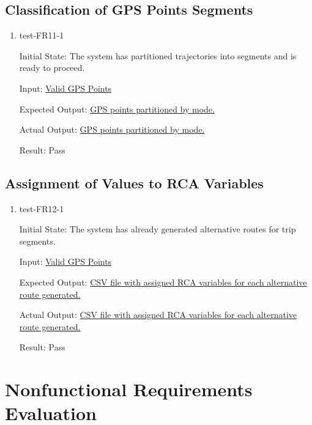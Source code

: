 \documentclass[12pt, titlepage]{article}
\begin{document}
\subsection{Classification of GPS Points Segments}
\begin{enumerate}
    \item test-FR11-1\label{test-FR11-1}
    
    Initial State: The system has partitioned trajectories into segments and is ready to proceed.
    
    Input: \href{https://github.com/paezha/PyERT-BLACK/blob/rev0-test/quarto-example/data/sample-gps/sample-gps-1.csv}{Valid GPS Points}
    
    Expected Output: \href{https://github.com/paezha/PyERT-BLACK/blob/rev0-test/test/test_data/fr-tests/fr11-1-expected.csv}{GPS points partitioned by mode.}
    
    Actual Output: \href{https://github.com/paezha/PyERT-BLACK/blob/rev0-test/test/test_data/fr-tests/fr11-1-out.csv}{GPS points partitioned by mode.}
    
    Result: Pass
\end{enumerate}

\subsection{Assignment of Values to RCA Variables}
\begin{enumerate}
    \item test-FR12-1\label{test-FR12-1}
    
    Initial State: The system has already generated alternative routes for trip segments.
    
    Input: \href{https://github.com/paezha/PyERT-BLACK/blob/rev0-test/quarto-example/data/sample-gps/sample-gps-1.csv}{Valid GPS Points}
    
    Expected Output: \href{https://github.com/paezha/PyERT-BLACK/blob/rev0-test/test/test_data/fr-tests/fr12-1-expected.csv}{CSV file with assigned RCA variables for each alternative route generated.}
    
    Actual Output: \href{https://github.com/paezha/PyERT-BLACK/blob/rev0-test/test/test_data/fr-tests/fr12-1-out.csv}{CSV file with assigned RCA variables for each alternative route generated.}
    
    Result: Pass
\end{enumerate}

\section{Nonfunctional Requirements Evaluation}
\end{document}
